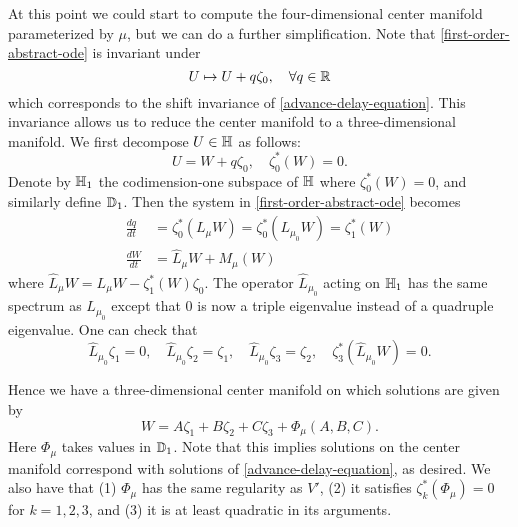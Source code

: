 At this point we could start to compute the four-dimensional center manifold parameterized by \(\mu\), but we can do a further simplification. Note that \cref{first-order-abstract-ode} is invariant under 
\begin{equation}
	U \mapsto U + q \zeta_0, \quad \forall q \in \mathbb{R}
\end{equation}
which corresponds to the shift invariance of \cref{advance-delay-equation}. This invariance allows us to reduce the center manifold to a three-dimensional manifold. We first decompose \(U \in \mathbb{H}\) as follows:
\begin{equation}
	U = W + q \zeta_0, \quad \zeta_0^*(W) = 0.
\end{equation}
Denote by \(\mathbb{H}_1\) the codimension-one subspace of \(\mathbb{H}\) where \(\zeta_0^*(W) = 0\), and similarly define \(\mathbb{D}_1\). Then the system in \cref{first-order-abstract-ode} becomes
\begin{align}
	\frac{dq}{dt} &= \zeta_0^*(L_{\mu} W) = \zeta_0^*(L_{\mu_0} W) = \zeta_1^*(W) \label{ode-for-q} \\
	\frac{d W}{dt} &= \widehat{L}_\mu W + M_\mu(W) \label{reduced-first-order-system}
\end{align}
where \(\widehat{L}_\mu W = L_\mu W - \zeta_1^*(W)\zeta_0\). The operator \(\widehat L_{\mu_0}\) acting on \(\mathbb{H}_1\) has the same spectrum as \(L_{\mu_0}\) except that \(0\) is now a triple eigenvalue instead of a quadruple eigenvalue. One can check that
\begin{equation}\label{reduced-eigenfunction}
	\widehat{L}_{\mu_0} \zeta_1 = 0, \quad \widehat{L}_{\mu_0}\zeta_2 = \zeta_1, \quad \widehat{L}_{\mu_0}\zeta_3 = \zeta_2, \quad \zeta_3^*(\widehat{L}_{\mu_0}W) = 0.
\end{equation}

Hence we have a three-dimensional center manifold on which solutions are given by
\begin{equation}\label{W-center-manifold}
	W = A \zeta_1 + B\zeta_2 + C\zeta_3 +\Phi_\mu(A,B,C).
\end{equation}
Here \(\Phi_\mu\) takes values in \(\mathbb{D}_1\). Note that this implies solutions on the center manifold correspond with solutions of \cref{advance-delay-equation}, as desired. We also have that (1) \(\Phi_\mu\) has the same regularity as \(V'\), (2) it satisfies \(\zeta_k^*(\Phi_\mu) = 0\) for \(k=1,2,3\),  and (3) it is at least quadratic in its arguments.

